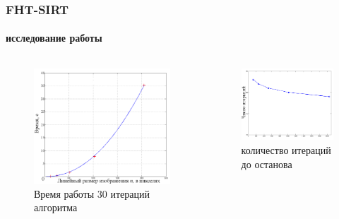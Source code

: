 \documentclass[12pt]{beamer}
\begin{document}
\begin{frame}
\frametitle{FHT-SIRT}
\framesubtitle{исследование работы}

\begin{columns}[T,onlytextwidth]
  \hspace*{-0.5cm}
  \begin{column}{0.53\textwidth}
    \begin{figure}
      \centering
      \includegraphics[width=\textwidth]{../Dissertation/images/part1_img/time_30_it}
      \caption{Время работы 30 итераций алгоритма}
    \end{figure}
  \end{column}
  \begin{column}{0.6\textwidth}
    \begin{figure}
      \centering
      \includegraphics[width=\textwidth]{../Dissertation/images/part1_img/it_till_stop}
      \caption{количество итераций до останова}
    \end{figure}
  \end{column}
\end{columns}
\end{frame}
\end{document}

